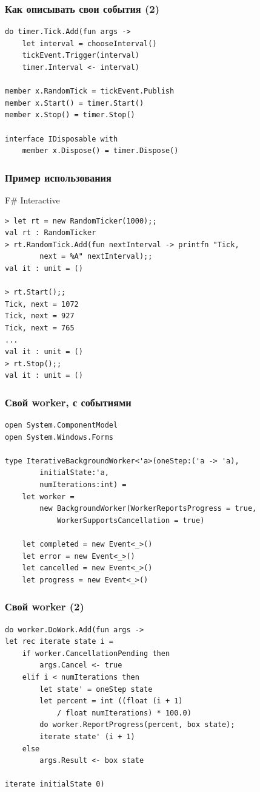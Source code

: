 \documentclass[xetex,mathserif,serif]{beamer}
\begin{document}
	\begin{frame}[fragile]
		\frametitle{Как описывать свои события (2)}
		\begin{verbatim}
do timer.Tick.Add(fun args ->
    let interval = chooseInterval()
    tickEvent.Trigger(interval)
    timer.Interval <- interval)

member x.RandomTick = tickEvent.Publish
member x.Start() = timer.Start()
member x.Stop() = timer.Stop()

interface IDisposable with
    member x.Dispose() = timer.Dispose()
		\end{verbatim}
\end{frame}

	\begin{frame}[fragile]
		\frametitle{Пример использования}
		\begin{alertblock}{F\# Interactive}
			\begin{verbatim}
> let rt = new RandomTicker(1000);;
val rt : RandomTicker
> rt.RandomTick.Add(fun nextInterval -> printfn "Tick, 
        next = %A" nextInterval);;
val it : unit = ()

> rt.Start();;
Tick, next = 1072
Tick, next = 927
Tick, next = 765
...
val it : unit = ()
> rt.Stop();;
val it : unit = ()
			\end{verbatim}
		\end{alertblock}
\end{frame}

	\begin{frame}[fragile]
		\frametitle{Свой worker, с событиями}
		\begin{verbatim}
open System.ComponentModel
open System.Windows.Forms

type IterativeBackgroundWorker<'a>(oneStep:('a -> 'a),
        initialState:'a,
        numIterations:int) =
    let worker =
        new BackgroundWorker(WorkerReportsProgress = true,
            WorkerSupportsCancellation = true)

    let completed = new Event<_>()
    let error = new Event<_>()
    let cancelled = new Event<_>()
    let progress = new Event<_>()
		\end{verbatim}
\end{frame}

	\begin{frame}[fragile]
		\frametitle{Свой worker (2)}
		\begin{verbatim}
do worker.DoWork.Add(fun args ->
let rec iterate state i =
    if worker.CancellationPending then
        args.Cancel <- true
    elif i < numIterations then
        let state' = oneStep state
        let percent = int ((float (i + 1) 
            / float numIterations) * 100.0)
        do worker.ReportProgress(percent, box state);
        iterate state' (i + 1)
    else
        args.Result <- box state

iterate initialState 0)
		\end{verbatim}
\end{frame}
\end{document}
